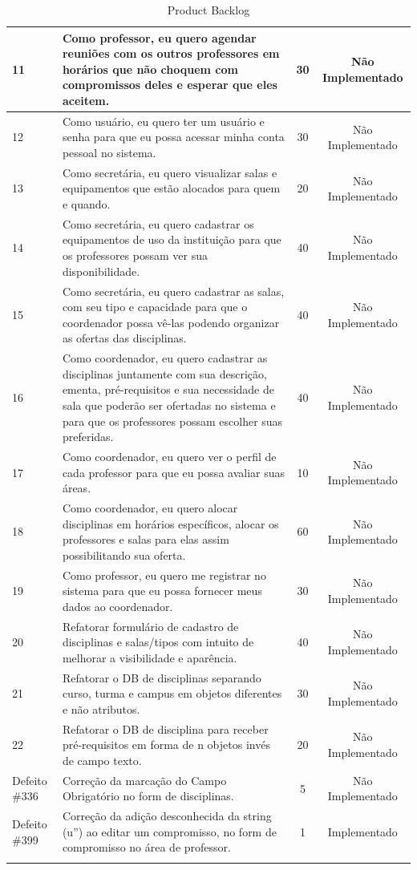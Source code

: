 \documentclass{abnt}
\begin{document}
\begin{landscape}
\begin{longtable}{|p{0.5in}|p{6in}|c|c|}
		        11 & Como professor, eu quero agendar reuniões com os outros professores em horários que não choquem com compromissos deles e esperar que eles aceitem.  &         30 & Não Implementado \\
		\hline
		        12 & Como usuário, eu quero ter um usuário e senha para que eu possa acessar minha conta pessoal no sistema. &         30 & Não Implementado \\
		\hline
		        13 & Como secretária, eu quero visualizar salas e equipamentos que estão alocados para quem e quando.  &         20 & Não Implementado \\
		\hline
		        14 & Como secretária, eu quero cadastrar os equipamentos de uso da instituição para que os professores possam ver sua disponibilidade.  &         40 & Não Implementado \\
		\hline
		        15 & Como secretária, eu quero cadastrar as salas, com seu tipo e capacidade para que o coordenador possa vê-las podendo organizar as ofertas das disciplinas. &         40 & Não Implementado \\
		\hline
		        16 & Como coordenador, eu quero cadastrar as disciplinas juntamente com sua descrição, ementa, pré-requisitos e sua necessidade de sala que poderão ser ofertadas no sistema e para que os professores possam escolher suas preferidas. &         40 & Não Implementado \\
		\hline
		        17 & Como coordenador, eu quero ver o perfil de cada professor para que eu possa avaliar suas áreas.  &         10 & Não Implementado \\
		\hline
		        18 & Como coordenador, eu quero alocar disciplinas em horários específicos, alocar os professores e salas para elas assim possibilitando sua oferta.  &         60 & Não Implementado \\
		\hline
		        19 & Como professor, eu quero me registrar no sistema para que eu possa fornecer meus dados ao coordenador. &         30 & Não Implementado \\
		\hline
		        20 & Refatorar formulário de cadastro de disciplinas e salas/tipos com intuito de melhorar a visibilidade e aparência.  &         40 & Não Implementado \\

		\hline
		        21 & Refatorar o DB de disciplinas separando curso, turma e campus em objetos diferentes e não atributos. &         30 & Não Implementado \\
		\hline
		        22 & Refatorar o DB de disciplina para receber pré-requisitos em forma de n objetos invés de campo texto. &         20 & Não Implementado \\
		\hline
		Defeito \#336 & Correção da marcação do Campo Obrigatório no form de disciplinas.  &          5 & Não Implementado \\
		\hline
		Defeito \#399  & Correção da adição desconhecida da string (u'') ao editar um compromisso, no form de compromisso no área de professor. &          1 & Implementado \\
		\hline
		\caption{Product Backlog}
		\end{longtable}
	\end{landscape}
		
\end{document}
